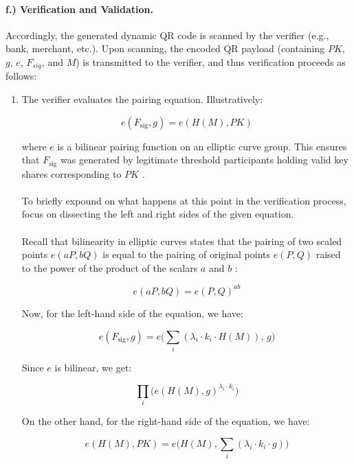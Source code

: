\documentclass[a4paper]{scl-article}
\begin{document}
\paragraph{f.) Verification and Validation.}
Accordingly, the generated dynamic QR code is scanned by the verifier (e.g., bank, merchant, etc.). Upon scanning, the encoded QR payload (containing $PK$, $g$, $e$, $F_{sig}$, and $M$) is transmitted to the verifier, and thus verification proceeds as follows:

\begin{enumerate}

    \item[a.)] The verifier evaluates the pairing equation. Illustratively:

    \[
    e(F_{\text{sig}}, g) = e(H(M), PK)
    \]

    \noindent where $e$ is a bilinear pairing function on an elliptic curve group. This ensures that $F_{\text{sig}}$ was generated by legitimate threshold participants holding valid key shares corresponding to $PK$ \cite{komlo2021}.

    \paragraph{}To briefly expound on what happens at this point in the verification process, focus on dissecting the left and right sides of the given equation.

    \paragraph{}Recall that bilinearity in elliptic curves states that the pairing of two scaled points $e(aP, bQ)$ is equal to the pairing of original points $e(P, Q)$ raised to the power of the product of the scalars $a$ and $b$ \cite{john2023}:

    \[
    e(aP, bQ) = e(P, Q)^{ab}
    \]

    Now, for the left-hand side of the equation, we have:

    \[
    e(F_{\text{sig}}, g) = e\Bigg(\sum_i (\lambda_i \cdot k_i \cdot H(M)),\, g\Bigg)
    \]
    
    Since $e$ is bilinear, we get:
    
    \[
    \prod_i \Big(e(H(M), g)^{\lambda_i \cdot k_i}\Big)
    \]
    
    On the other hand, for the right-hand side of the equation, we have:
    
    \[
    e(H(M), PK) = e\Big(H(M), \sum_i (\lambda_i \cdot k_i \cdot g)\Big)
    \]
    

\end{enumerate}
\end{document}
